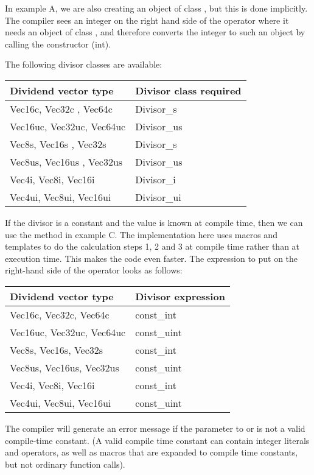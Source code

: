 \documentclass[vcl_manual.tex]{subfiles}
\begin{document}
In example A, we are also creating an object of class , but this is done implicitly. The compiler sees an integer on the right hand side of the \codei{/} operator where it needs an object of class , and therefore converts the integer  to such an object by calling the constructor (int).

The following divisor classes are available:

\begin{tabular}{|p{50mm}|p{50mm}|}
\hline
\bfseries Dividend vector type & \bfseries Divisor class required \\ \hline
Vec16c, Vec32c , Vec64c & Divisor\_s \\ \hline
Vec16uc, Vec32uc, Vec64uc & Divisor\_us \\ \hline
Vec8s, Vec16s , Vec32s & Divisor\_s \\ \hline
Vec8us, Vec16us , Vec32us & Divisor\_us \\ \hline
Vec4i, Vec8i, Vec16i & Divisor\_i \\ \hline
Vec4ui, Vec8ui, Vec16ui & Divisor\_ui \\ \hline
\end{tabular}

If the divisor is a constant and the value is known at compile time, then we can use the method in example C. The implementation here uses macros and templates to do the calculation steps 1, 2 and 3 at compile time rather than at execution time. This makes the code even faster. The expression to put on the right-hand side of the \codei{/} operator looks as follows:

\begin{tabular}{|p{50mm}|p{50mm}|}
\hline
\bfseries Dividend vector type & \bfseries Divisor expression \\ \hline
Vec16c, Vec32c, Vec64c & const\_int \\ \hline
Vec16uc, Vec32uc, Vec64uc & const\_uint \\ \hline
Vec8s, Vec16s, Vec32s & const\_int \\ \hline
Vec8us, Vec16us, Vec32us & const\_uint \\ \hline
Vec4i, Vec8i, Vec16i & const\_int \\ \hline
Vec4ui, Vec8ui, Vec16ui & const\_uint \\ \hline
\end{tabular}

The compiler will generate an error message if the parameter to  or  is not a valid compile-time constant. (A valid compile time constant can contain integer literals and operators, as well as macros that are expanded to compile time constants, but not ordinary function calls).
\end{document}
